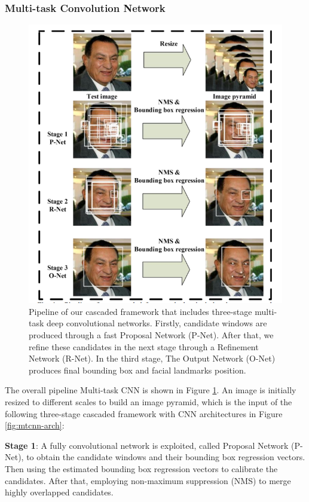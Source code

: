 \documentclass[journal, twocolumn]{IEEEtran}
\begin{document}
\subsubsection{Multi-task Convolution Network}
\begin{figure}
    \centering
    \includegraphics[width=1\linewidth]{img/mtcnn.png}
	\caption{Pipeline of our cascaded framework that includes three-stage multi-task deep convolutional networks. Firstly, candidate windows are produced
through a fast Proposal Network (P-Net). After that, we refine these candidates
in the next stage through a Refinement Network (R-Net). In the third stage,
The Output Network (O-Net) produces final bounding box and facial landmarks position.}\label{fig:mtcnn}
\end{figure}

The overall pipeline Multi-task CNN is shown in Figure \ref{fig:mtcnn}. An image is  initially resized to different scales to build an image pyramid, which is the input of the following three-stage cascaded framework with CNN architectures in Figure \ref{fig:mtcnn-arch}:

\textbf{Stage 1}: A fully convolutional network is exploited, called Proposal Network (P-Net), to obtain the candidate windows and their bounding box regression vectors. Then using the estimated bounding box regression vectors to calibrate the candidates. After that, employing non-maximum suppression (NMS) to merge highly overlapped candidates.
\end{document}
